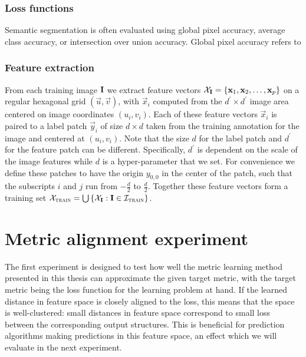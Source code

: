 \subsubsection{Loss functions}

Semantic segmentation is often evaluated using global pixel accuracy, average class accuracy, or intersection over union accuracy. Global pixel accuracy refers to 


\subsubsection{Feature extraction}

From each training image $\mathbf{I}$ we extract feature vectors $\mathcal{X}_{\mathbf{I}} = \left\{ \mathbf{x}_1, \mathbf{x}_2, \ldots, \mathbf{x}_p \right\}$ on a regular hexagonal grid $(\vec{u}, \vec{v})$, with $\vec{x}_i$ computed from the $d^\prime \times d^\prime$ image area centered on image coordinates $(u_i, v_i)$. Each of these feature vectors $\vec{x}_i$ is paired to a label patch $\vec{y}_i$ of size $d \times d$ taken from the training annotation for the image and centered at $(u_i, v_i)$. Note that the size $d$ for the label patch and $d^\prime$ for the feature patch can be different. Specifically, $d^\prime$ is dependent on the scale of the image features while $d$ is a hyper-parameter that we set. For convenience we define these patches to have the origin $y_{0,0}$ in the center of the patch, such that the subscripts $i$ and $j$ run from $-\tfrac{d}{2}$ to $\tfrac{d}{2}$. Together these feature vectors form a training set $\mathcal{X}_\textsc{train} = \bigcup\left\{\mathcal{X}_{\mathbf{I}}: \mathbf{I} \in \mathcal{I}_\textsc{train} \right\}$.



\section{Metric alignment experiment}

The first experiment is designed to test how well the metric learning method presented in this thesis can approximate the given target metric, with the target metric being the loss function for the learning problem at hand. If the learned distance in feature space is closely aligned to the loss, this means that the space is well-clustered: small distances in feature space correspond to small loss between the corresponding output structures. This is beneficial for prediction algorithms making predictions in this feature space, an effect which we will evaluate in the next experiment.

